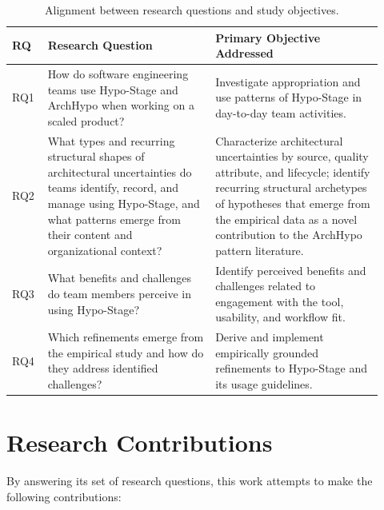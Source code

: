 \begin{table}[htbp]
\centering
\caption{Alignment between research questions and study objectives.}
\label{tab:rq-objectives}
\begin{tabular}{p{0.08\linewidth} p{0.42\linewidth} p{0.42\linewidth}}
\toprule
\textbf{RQ} & \textbf{Research Question} & \textbf{Primary Objective Addressed} \\
\midrule
RQ1 & How do software engineering teams use Hypo-Stage and ArchHypo when working on a scaled product? & Investigate appropriation and use patterns of Hypo-Stage in day-to-day team activities. \\
\midrule
RQ2 & What types and recurring structural shapes of architectural uncertainties do teams identify, record, and manage using Hypo-Stage, and what patterns emerge from their content and organizational context? & Characterize architectural uncertainties by source, quality attribute, and lifecycle; identify recurring structural archetypes of hypotheses that emerge from the empirical data as a novel contribution to the ArchHypo pattern literature. \\
\midrule
RQ3 & What benefits and challenges do team members perceive in using Hypo-Stage? & Identify perceived benefits and challenges related to engagement with the tool, usability, and workflow fit. \\
\midrule
RQ4 & Which refinements emerge from the empirical study and how do they address identified challenges? & Derive and implement empirically grounded refinements to Hypo-Stage and its usage guidelines. \\
\bottomrule
\end{tabular}
\end{table}

\section{Research Contributions}

By answering its set of research questions, this work attempts to make the following contributions:

